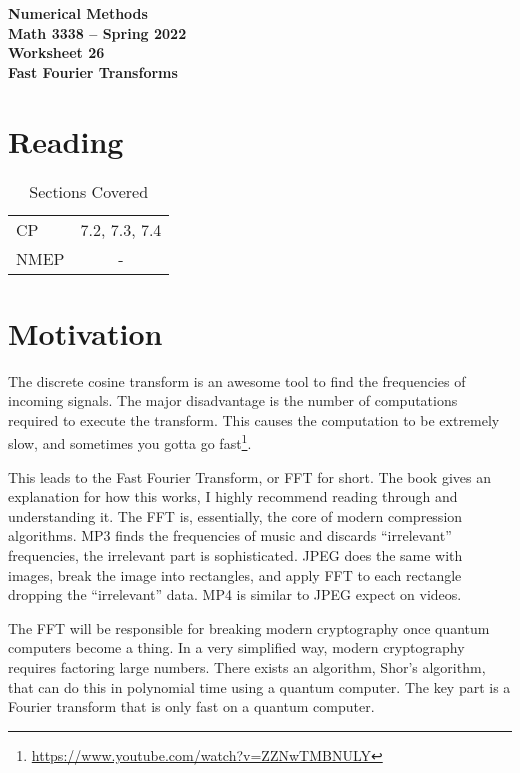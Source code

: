 \documentclass[11pt,letterpaper]{article}
\newcommand{\semester}{Spring 2022}
\begin{document}
\begin{center}
{\huge{\bf  Numerical Methods}} \\[1.5ex]
{\bf Math 3338 -- \semester}\\[1.5ex]
{\Large{\bf Worksheet 26\ \\[2ex] Fast Fourier Transforms}}\\
\end{center}
\vspace{2mm}


\section{Reading}

\begin{table}[!ht]
 \centering
 \begin{tabular}{lc}
   CP &  7.2, 7.3, 7.4 \\
 NMEP &  -
 \end{tabular}
\caption{Sections Covered}
\end{table}

\section{Motivation}
The discrete cosine transform is an awesome tool to find the frequencies of incoming signals.
The major disadvantage is the number of computations required to execute the transform. This
causes the computation to be extremely slow, and sometimes you gotta go fast\footnote{\url{https://www.youtube.com/watch?v=ZZNwTMBNULY}}.


This leads to the Fast Fourier Transform, or FFT for short. The book gives an explanation for how 
this works, I highly recommend reading through and understanding it. The FFT is, essentially, the
core of modern compression algorithms. MP3 finds the frequencies of music and discards ``irrelevant''
frequencies, the irrelevant part is sophisticated. JPEG does the same with images, break the image
into rectangles, and apply FFT to each rectangle dropping the ``irrelevant'' data. MP4 is similar to
JPEG expect on videos. 

The FFT will be responsible for breaking modern cryptography once quantum computers become a thing.
In a very simplified way, modern cryptography requires factoring large numbers. There exists an 
algorithm, Shor's algorithm, that can do this in polynomial time using a quantum computer. The key
part is a Fourier transform that is only fast on a quantum computer.
\end{document}
